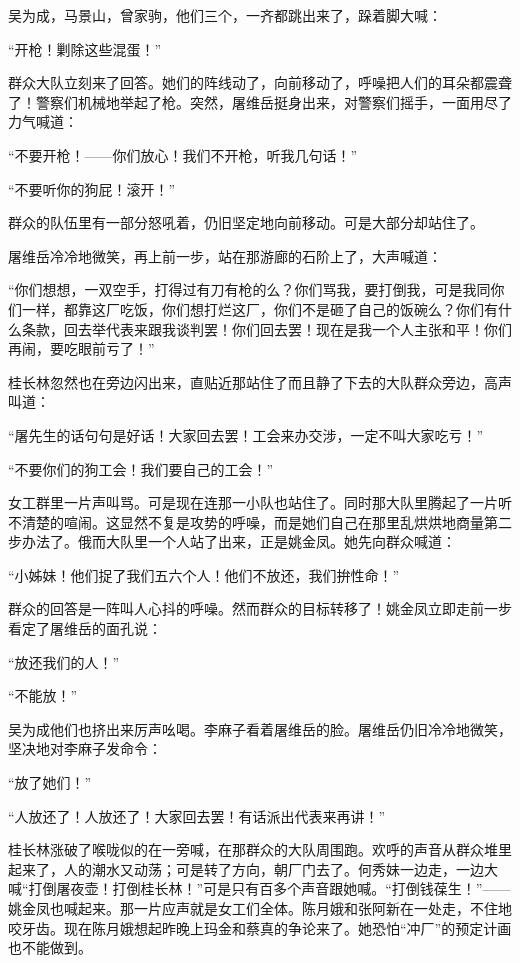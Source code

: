 \par 吴为成，马景山，曾家驹，他们三个，一齐都跳出来了，跺着脚大喊：
\par “开枪！剿除这些混蛋！”
\par 群众大队立刻来了回答。她们的阵线动了，向前移动了，呼噪把人们的耳朵都震聋了！警察们机械地举起了枪。突然，屠维岳挺身出来，对警察们摇手，一面用尽了力气喊道：
\par “不要开枪！——你们放心！我们不开枪，听我几句话！”
\par “不要听你的狗屁！滚开！”
\par 群众的队伍里有一部分怒吼着，仍旧坚定地向前移动。可是大部分却站住了。
\par 屠维岳冷冷地微笑，再上前一步，站在那游廊的石阶上了，大声喊道：
\par “你们想想，一双空手，打得过有刀有枪的么？你们骂我，要打倒我，可是我同你们一样，都靠这厂吃饭，你们想打烂这厂，你们不是砸了自己的饭碗么？你们有什么条款，回去举代表来跟我谈判罢！你们回去罢！现在是我一个人主张和平！你们再闹，要吃眼前亏了！”
\par 桂长林忽然也在旁边闪出来，直贴近那站住了而且静了下去的大队群众旁边，高声叫道：
\par “屠先生的话句句是好话！大家回去罢！工会来办交涉，一定不叫大家吃亏！”
\par “不要你们的狗工会！我们要自己的工会！”
\par 女工群里一片声叫骂。可是现在连那一小队也站住了。同时那大队里腾起了一片听不清楚的喧闹。这显然不复是攻势的呼噪，而是她们自己在那里乱烘烘地商量第二步办法了。俄而大队里一个人站了出来，正是姚金凤。她先向群众喊道：
\par “小姊妹！他们捉了我们五六个人！他们不放还，我们拚性命！”
\par 群众的回答是一阵叫人心抖的呼噪。然而群众的目标转移了！姚金凤立即走前一步看定了屠维岳的面孔说：
\par “放还我们的人！”
\par “不能放！”
\par 吴为成他们也挤出来厉声吆喝。李麻子看着屠维岳的脸。屠维岳仍旧冷冷地微笑，坚决地对李麻子发命令：
\par “放了她们！”
\par “人放还了！人放还了！大家回去罢！有话派出代表来再讲！”
\par 桂长林涨破了喉咙似的在一旁喊，在那群众的大队周围跑。欢呼的声音从群众堆里起来了，人的潮水又动荡；可是转了方向，朝厂门去了。何秀妹一边走，一边大喊“打倒屠夜壶！打倒桂长林！”可是只有百多个声音跟她喊。“打倒钱葆生！”——姚金凤也喊起来。那一片应声就是女工们全体。陈月娥和张阿新在一处走，不住地咬牙齿。现在陈月娥想起昨晚上玛金和蔡真的争论来了。她恐怕“冲厂”的预定计画也不能做到。
